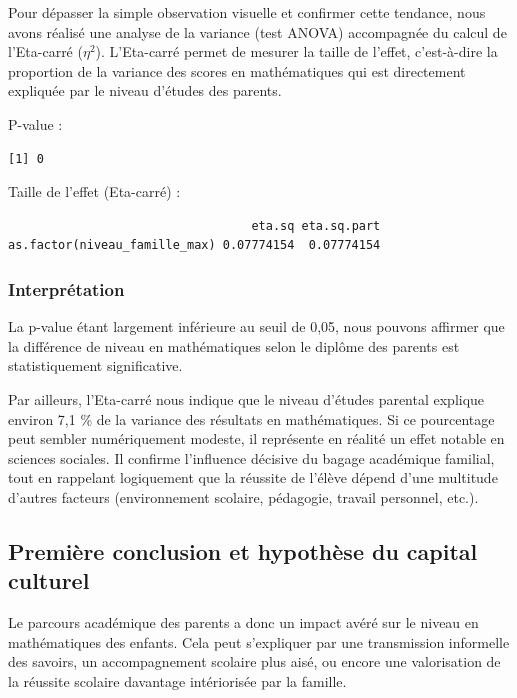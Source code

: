 \documentclass[
  french,
  11pt,
  a4paper,
]{report}
\begin{document}
Pour dépasser la simple observation visuelle et confirmer cette
tendance, nous avons réalisé une analyse de la variance (test ANOVA)
accompagnée du calcul de l'Eta-carré (\(\eta^2\)). L'Eta-carré permet de
mesurer la taille de l'effet, c'est-à-dire la proportion de la variance
des scores en mathématiques qui est directement expliquée par le niveau
d'études des parents.

P-value :

\begin{verbatim}
[1] 0
\end{verbatim}

Taille de l'effet (Eta-carré) :

\begin{verbatim}
                                  eta.sq eta.sq.part
as.factor(niveau_famille_max) 0.07774154  0.07774154
\end{verbatim}

\subsubsection{Interprétation}\label{interpruxe9tation}

La p-value étant largement inférieure au seuil de 0,05, nous pouvons
affirmer que la différence de niveau en mathématiques selon le diplôme
des parents est statistiquement significative.

Par ailleurs, l'Eta-carré nous indique que le niveau d'études parental
explique environ 7,1 \% de la variance des résultats en mathématiques.
Si ce pourcentage peut sembler numériquement modeste, il représente en
réalité un effet notable en sciences sociales. Il confirme l'influence
décisive du bagage académique familial, tout en rappelant logiquement
que la réussite de l'élève dépend d'une multitude d'autres facteurs
(environnement scolaire, pédagogie, travail personnel, etc.).

\subsection{Première conclusion et hypothèse du capital
culturel}\label{premiuxe8re-conclusion-et-hypothuxe8se-du-capital-culturel}

Le parcours académique des parents a donc un impact avéré sur le niveau
en mathématiques des enfants. Cela peut s'expliquer par une transmission
informelle des savoirs, un accompagnement scolaire plus aisé, ou encore
une valorisation de la réussite scolaire davantage intériorisée par la
famille.
\end{document}
